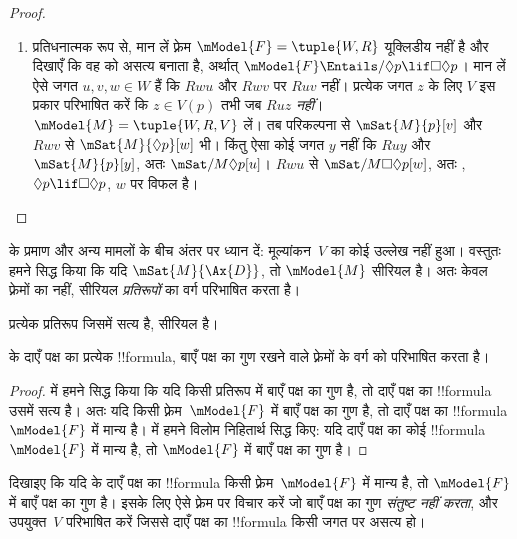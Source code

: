 \documentclass[../../../include/open-logic-section]{subfiles}
\begin{document}
\begin{proof}
\begin{enumerate}
    $\mSat{M}{p}[w]$, और $V$ की परिभाषा से यह केवल $Ruw$ होने पर संभव है।
  \item प्रतिधनात्मक रूप से, मान लें फ़्रेम $\mModel{F} = \tuple{W, R}$
    यूक्लिडीय नहीं है और दिखाएँ कि वह  को असत्य बनाता है, अर्थात्
    $\mModel{F} \Entails/ \Diamond p \lif \Box\Diamond p$। मान लें ऐसे
    जगत $u,v,w \in W$ हैं कि $Rwu$ और $Rwv$ पर $Ruv$ नहीं। प्रत्येक जगत
    $z$ के लिए $V$ इस प्रकार परिभाषित करें कि $z \in V(p)$ तभी जब
    $Ruz$ \emph{नहीं}। $\mModel{M} =\tuple{W, R, V}$ लें। तब परिकल्पना से
    $\mSat{M}{p}[v]$ और $Rwv$ से $\mSat{M}{\Diamond p}[w]$ भी। किंतु ऐसा
    कोई जगत $y$ नहीं कि $Ruy$ और $\mSat{M}{p}[y]$, अतः
    $\mSat/{M}{\Diamond p}[u]$। $Rwu$ से
    $\mSat/{M}{\Box\Diamond p}[w]$, अतः ,
    $\Diamond p \lif \Box\Diamond p$, $w$ पर विफल है।
  \end{enumerate}
\end{proof}

 के प्रमाण और अन्य मामलों के बीच अंतर पर ध्यान दें: मूल्यांकन~$V$ का
कोई उल्लेख नहीं हुआ। वस्तुतः हमने सिद्ध किया कि यदि $\mSat{M}{\Ax{D}}$, तो
$\mModel{M}$ सीरियल है। अतः  केवल फ़्रेमों का नहीं, सीरियल
\emph{प्रतिरूपों} का वर्ग परिभाषित करता है।

\begin{cor}
  प्रत्येक प्रतिरूप जिसमें  सत्य है, सीरियल है।
\end{cor}

\begin{cor}
 के दाएँ पक्ष का प्रत्येक !!{formula}, बाएँ पक्ष का गुण
रखने वाले फ़्रेमों के वर्ग को परिभाषित करता है।
\end{cor}

\begin{proof}
   में हमने सिद्ध किया कि यदि किसी प्रतिरूप में
  बाएँ पक्ष का गुण है, तो दाएँ पक्ष का !!{formula} उसमें सत्य है। अतः यदि किसी
  फ़्रेम~$\mModel{F}$ में बाएँ पक्ष का गुण है, तो दाएँ पक्ष का !!{formula}
  $\mModel{F}$ में मान्य है।  में हमने विलोम
  निहितार्थ सिद्ध किए: यदि दाएँ पक्ष का कोई !!{formula} $\mModel{F}$ में मान्य
  है, तो $\mModel{F}$ में बाएँ पक्ष का गुण है।
\end{proof}

\begin{prob}
दिखाइए कि यदि  के दाएँ पक्ष का
!!{formula} किसी फ़्रेम~$\mModel{F}$ में मान्य है, तो $\mModel{F}$ में बाएँ
पक्ष का गुण है। इसके लिए ऐसे फ़्रेम पर विचार करें जो बाएँ पक्ष का गुण
\emph{संतुष्ट नहीं करता}, और उपयुक्त~$V$ परिभाषित करें जिससे दाएँ पक्ष का
!!{formula} किसी जगत पर असत्य हो।
\end{prob}
\end{document}
